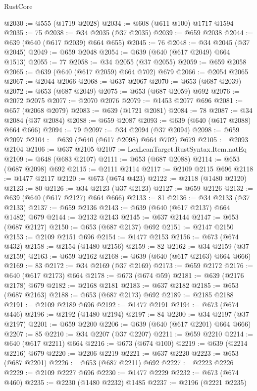 \begin{lexlean}{RustCore}
\begin{coremodule}
@2030 := @555 (@1719 @2028)
@2034 := @608 (@611 @100) @1717 @1594
@2035 := 75
@2038 := @34 @2035 (@37 @2035)
@2039 := @659 @2038
@2044 := @639 (@640 (@617 @2039) @664 @655)
@2045 := 76
@2048 := @34 @2045 (@37 @2045)
@2049 := @659 @2048
@2054 := @639 (@640 (@617 @2049) @664 @1513)
@2055 := 77
@2058 := @34 @2055 (@37 @2055)
@2059 := @659 @2058
@2065 := @639 (@640 (@617 @2059) @664 @702) @679
@2066 := @2054 @2065
@2067 := @2044 @2066
@2068 := @637 @2067
@2070 := @653 (@687 @2039)
@2072 := @653 (@687 @2049)
@2075 := @653 (@687 @2059) @692
@2076 := @2072 @2075
@2077 := @2070 @2076
@2079 := @1453 @2077 @696
@2081 := @657 (@2068 @2079)
@2083 := @639 (@1721 @2081)
@2084 := 78
@2087 := @34 @2084 (@37 @2084)
@2088 := @659 @2087
@2093 := @639 (@640 (@617 @2088) @664 @666)
@2094 := 79
@2097 := @34 @2094 (@37 @2094)
@2098 := @659 @2097
@2104 := @639 (@640 (@617 @2098) @664 @702) @679
@2105 := @2093 @2104
@2106 := @637 @2105
@2107 := LexLeanTarget.RustSyntax.Item.natEq
@2109 := @648 (@683 @2107)
@2111 := @653 (@687 @2088)
@2114 := @653 (@687 @2098) @692
@2115 := @2111 @2114
@2117 := @2109 @2115 @696
@2118 := @1477 @2117
@2120 := @673 (@674 @423)
@2122 := @2118 (@1480 @2120)
@2123 := 80
@2126 := @34 @2123 (@37 @2123)
@2127 := @659 @2126
@2132 := @639 (@640 (@617 @2127) @664 @666)
@2133 := 81
@2136 := @34 @2133 (@37 @2133)
@2137 := @659 @2136
@2143 := @639 (@640 (@617 @2137) @664 @1482) @679
@2144 := @2132 @2143
@2145 := @637 @2144
@2147 := @653 (@687 @2127)
@2150 := @653 (@687 @2137) @692
@2151 := @2147 @2150
@2153 := @2109 @2151 @696
@2154 := @1477 @2153
@2156 := @673 (@674 @432)
@2158 := @2154 (@1480 @2156)
@2159 := 82
@2162 := @34 @2159 (@37 @2159)
@2163 := @659 @2162
@2168 := @639 (@640 (@617 @2163) @664 @666)
@2169 := 83
@2172 := @34 @2169 (@37 @2169)
@2173 := @659 @2172
@2176 := @640 (@617 @2173) @664
@2178 := @673 (@674 @59)
@2181 := @639 (@2176 @2178) @679
@2182 := @2168 @2181
@2183 := @637 @2182
@2185 := @653 (@687 @2163)
@2188 := @653 (@687 @2173) @692
@2189 := @2185 @2188
@2191 := @2109 @2189 @696
@2192 := @1477 @2191
@2194 := @673 (@674 @446)
@2196 := @2192 (@1480 @2194)
@2197 := 84
@2200 := @34 @2197 (@37 @2197)
@2201 := @659 @2200
@2206 := @639 (@640 (@617 @2201) @664 @666)
@2207 := 85
@2210 := @34 @2207 (@37 @2207)
@2211 := @659 @2210
@2214 := @640 (@617 @2211) @664
@2216 := @673 (@674 @100)
@2219 := @639 (@2214 @2216) @679
@2220 := @2206 @2219
@2221 := @637 @2220
@2223 := @653 (@687 @2201)
@2226 := @653 (@687 @2211) @692
@2227 := @2223 @2226
@2229 := @2109 @2227 @696
@2230 := @1477 @2229
@2232 := @673 (@674 @460)
@2235 := @2230 (@1480 @2232) @1485
@2237 := @2196 (@2221 @2235)

\end{coremodule}
\end{lexlean}
